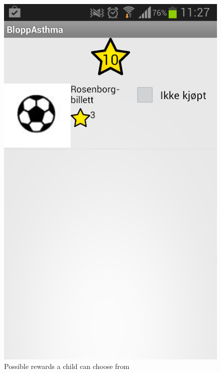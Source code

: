\begin{figure}
\begin{minipage}[t]{0.25\linewidth}
			\includegraphics[width=0.20\paperwidth]{Pictures/new-screenshots/child-possible-rewards.png}
		\caption{Possible rewards a child can choose from}
		\label{fig:child-possible-rewards}
	\end{minipage}
	\hspace{1cm}
	\begin{minipage}[t]{0.25\linewidth}
		\centering

\end{minipage}
\end{figure}
